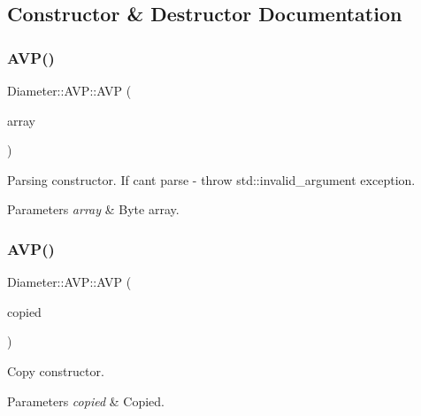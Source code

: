 \subsection{Constructor \& Destructor Documentation}
\mbox{\label{classDiameter_1_1AVP_a8ff7f26ccb7c31a2342d9e1895cb5f36}} 
\subsubsection{\texorpdfstring{A\+V\+P()}{AVP()}\hspace{0.1cm}{\footnotesize\ttfamily [1/2]}}
{\footnotesize\ttfamily Diameter\+::\+A\+V\+P\+::\+A\+VP (\begin{DoxyParamCaption}\item[{const Byte\+Array \&}]{array }\end{DoxyParamCaption})\hspace{0.3cm}{\ttfamily [explicit]}}



Parsing constructor. If can\textquotesingle{}t parse -\/ throw std\+::invalid\+\_\+argument exception. 


\begin{DoxyParams}{Parameters}
{\em array} & Byte array. \\
\hline
\end{DoxyParams}
\mbox{\label{classDiameter_1_1AVP_a29fee29a78083e59cd37636f2672b037}} 
\subsubsection{\texorpdfstring{A\+V\+P()}{AVP()}\hspace{0.1cm}{\footnotesize\ttfamily [2/2]}}
{\footnotesize\ttfamily Diameter\+::\+A\+V\+P\+::\+A\+VP (\begin{DoxyParamCaption}\item[{const \hyperlink{classDiameter_1_1AVP}{A\+VP} \&}]{copied }\end{DoxyParamCaption})}



Copy constructor. 


\begin{DoxyParams}{Parameters}
{\em copied} & Copied. \\
\hline
\end{DoxyParams}


